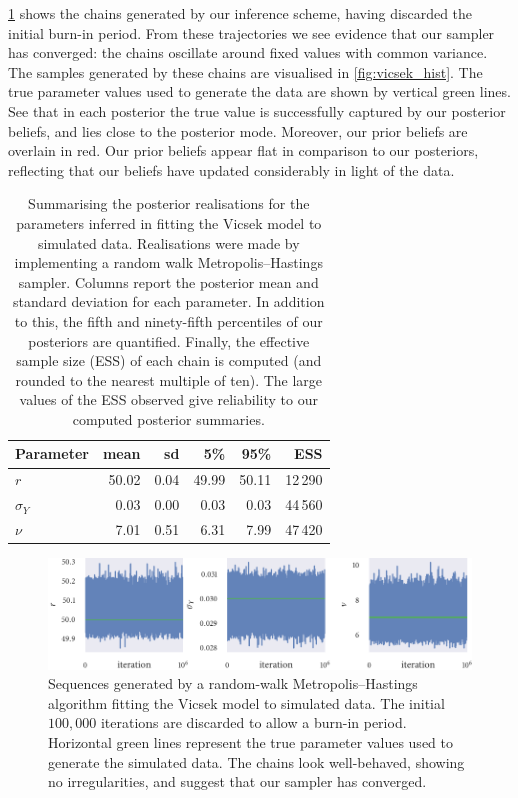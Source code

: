 \cref{fig:vicsek_trace} shows the chains generated by our inference scheme,
having discarded the initial burn-in period. From these trajectories we see
evidence that our sampler has converged: the chains oscillate around fixed
values with common variance. The samples generated by these chains are
visualised in \cref{fig:vicsek_hist}. The true parameter values used to
generate the data are shown by vertical green lines. See that in each posterior
the true value is successfully captured by our posterior beliefs, and lies
close to the posterior mode. Moreover, our prior beliefs are overlain in red.
Our prior beliefs appear flat in comparison to our posteriors, reflecting that
our beliefs have updated considerably in light of the data.

\begin{table}[tbp]
  \begin{tabular}{@{}lrrrrr@{}}
    \toprule
    Parameter    & mean  & sd   & 5\%   & 95\%  & ESS     \\
    \midrule
    $r$          & 50.02 & 0.04 & 49.99 & 50.11 & 12\,290 \\
    $\sigma_{Y}$ & 0.03  & 0.00 & 0.03  & 0.03  & 44\,560 \\
    $\nu$        & 7.01  & 0.51 & 6.31  & 7.99  & 47\,420 \\
    \bottomrule
  \end{tabular}
  \caption{Summarising the posterior realisations for the parameters inferred
    in fitting the Vicsek model to simulated data. Realisations were made by
    implementing a random walk Metropolis--Hastings sampler. Columns report
    the posterior mean and standard deviation for each parameter. In addition
    to this, the fifth and ninety-fifth percentiles of our posteriors are
    quantified. Finally, the effective sample size (ESS) of each chain is
    computed (and rounded to the nearest multiple of ten). The large values
    of the ESS observed give reliability to our computed posterior summaries.}
  \label{tab:vicsek_summary}
\end{table}%
\begin{figure}[tbp]
  \includegraphics{r_trace.pdf}
  \caption{Sequences generated by a random-walk Metropolis--Hastings algorithm
    fitting the Vicsek model to simulated data. The initial $100,000$
    iterations are discarded to allow a burn-in period. Horizontal green
    lines represent the true parameter values used to generate the simulated
    data. The chains look well-behaved, showing no irregularities, and suggest
    that our sampler has converged.}
  \label{fig:vicsek_trace}
\end{figure}%
